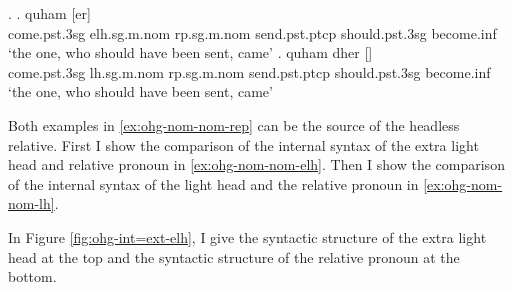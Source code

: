\ex.\label{ex:ohg-nom-nom-rep}
\ag. quham [er]    \\
 come.\ac{pst}.3\ac{sg}\scsub{[nom]} \ac{elh}.\ac{sg}.\ac{m}.\ac{nom} \ac{rp}.\ac{sg}.\ac{m}.\ac{nom} send.\ac{pst}.\ac{ptcp}\scsub{[nom]} should.\ac{pst}.3\ac{sg} become.\ac{inf}\\
 `the one, who should have been sent, came' \label{ex:ohg-nom-nom-elh}
\bg. quham dher []   \\
 come.\ac{pst}.3\ac{sg}\scsub{[nom]} \ac{lh}.\ac{sg}.\ac{m}.\ac{nom} \ac{rp}.\ac{sg}.\ac{m}.\ac{nom} send.\ac{pst}.\ac{ptcp}\scsub{[nom]} should.\ac{pst}.3\ac{sg} become.\ac{inf}\\
 `the one, who should have been sent, came' \label{ex:ohg-nom-nom-lh}

Both examples in \ref{ex:ohg-nom-nom-rep} can be the source of the headless relative. First I show the comparison of the internal syntax of the extra light head and relative pronoun in \ref{ex:ohg-nom-nom-elh}. Then I show the comparison of the internal syntax of the light head and the relative pronoun in \ref{ex:ohg-nom-nom-lh}.

In Figure \ref{fig:ohg-int=ext-elh}, I give the syntactic structure of the extra light head at the top and the syntactic structure of the relative pronoun at the bottom.

